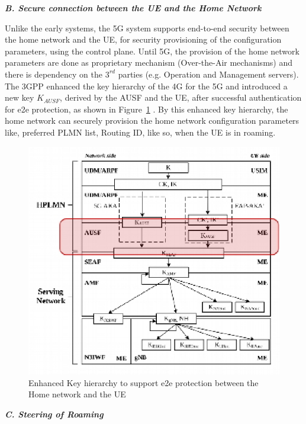 \begin{multicols}{2}
\noindent
{\bf {\textit{B. Secure connection between the UE and the Home Network}}}

Unlike the early systems, the 5G system supports end-to-end security between the home network and the UE, for security provisioning of the configuration parameters, using the control plane. Until 5G, the provision of the home network parameters are done as proprietary mechanism (Over-the-Air mechanisms) and there is dependency on the $\text{3}^{rd}$ parties (e.g. Operation and Management servers). The 3GPP enhanced the key hierarchy of the 4G for the 5G and introduced a new key $K_{AUSF}$, derived by the AUSF and the UE, after successful authentication for e2e protection, as shown in Figure~\ref{chap4-fig03} \cite{art4-key03}. By this enhanced key hierarchy, the home network can securely provision the home network configuration parameters like, preferred PLMN list, Routing ID, like so, when the UE is in roaming.
\begin{figure}[H]
\centering
\includegraphics[scale=1.8]{src/Figures/chap4/chap4-fig03.jpg}
\caption{ Enhanced Key hierarchy to support e2e protection between the Home network and the UE}\label{chap4-fig03}
\end{figure}

\noindent
{\bf {\textit{C. Steering of Roaming}}}


\end{multicols}
